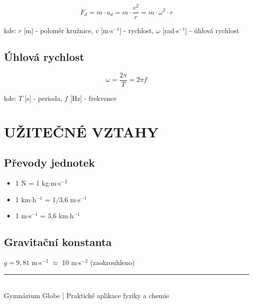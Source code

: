 \documentclass[a4paper,11pt]{article}
\begin{document}
\begin{equationbox}
\begin{equation*}
    F_d = m \cdot a_d = m \cdot \frac{v^2}{r} = m \cdot \omega^2 \cdot r
\end{equation*}
\end{equationbox}

\begin{notebox}
kde: $r$ [m] - poloměr kružnice, $v$ [m$\cdot$s$^{-1}$] - rychlost, $\omega$ [rad$\cdot$s$^{-1}$] - úhlová rychlost
\end{notebox}

\subsection{Úhlová rychlost}

\begin{equationbox}
\begin{equation*}
    \omega = \frac{2\pi}{T} = 2\pi f
\end{equation*}
\end{equationbox}

\begin{notebox}
kde: $T$ [s] - perioda, $f$ [Hz] - frekvence
\end{notebox}

\section{UŽITEČNÉ VZTAHY}

\subsection{Převody jednotek}

\begin{notebox}
\begin{itemize}
    \item 1 N = 1 kg$\cdot$m$\cdot$s$^{-2}$
    \item 1 km$\cdot$h$^{-1}$ = 1/3,6 m$\cdot$s$^{-1}$
    \item 1 m$\cdot$s$^{-1}$ = 3,6 km$\cdot$h$^{-1}$
\end{itemize}
\end{notebox}

\subsection{Gravitační konstanta}

\begin{notebox}
$g = 9{,}81$ m$\cdot$s$^{-2}$ $\approx$ 10 m$\cdot$s$^{-2}$ (zaokrouhleno)
\end{notebox}

\vfill

\begin{center}
\rule{0.8\textwidth}{0.5pt}\\[0.3cm]
{\small Gymnázium Globe | Praktické aplikace fyziky a chemie}
\end{center}
\end{document}

